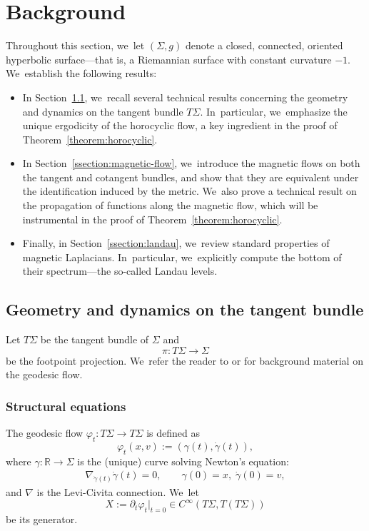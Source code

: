 \documentclass[JEP,XML,SOM,Unicode,published]{cedram}
\theoremstyle{plain}
\theoremstyle{definition}
\newcommand{\R}{\mathbb{R}}
\begin{document}
\section{Background}

\label{section:dynamical-geometric-background}

Throughout this section, we~let $(\Sigma, g)$ denote a closed, connected, oriented hyperbolic surface—that is, a Riemannian surface with constant curvature $-1$. We~establish the following results:

\begin{itemize}
\item In Section~\ref{ssection:geo}, we~recall several technical results concerning the geometry and dynamics on the tangent bundle $T\Sigma$. In~particular, we~emphasize the unique ergodicity of the horocyclic flow, a key ingredient in the proof of Theorem~\ref{theorem:horocyclic}.

\item In Section~\ref{ssection:magnetic-flow}, we~introduce the magnetic flows on both the tangent and cotangent bundles, and show that they are equivalent under the identification induced by the metric. We~also prove a technical result on the propagation of functions along the magnetic flow, which will be instrumental in the proof of Theorem~\ref{theorem:horocyclic}.

\item Finally, in Section~\ref{ssection:landau}, we~review standard properties of magnetic Laplacians. In~particular, we~explicitly compute the bottom of their spectrum—the so-called Landau levels. \end{itemize}

\subsection{Geometry and dynamics on the tangent bundle}

\label{ssection:geo}
Let $T\Sigma$ be the tangent bundle of $\Sigma$ and
\begin{equation}
\label{equation:footpoint}
\pi : T\Sigma \to \Sigma
\end{equation}
be the footpoint projection. We~refer the reader to \cite[Ch.\,1]{Paternain-99} or \cite[Ch.\,13]{Lefeuvre-book} for background material on the geodesic flow.

\subsubsection{Structural equations} The geodesic flow $\varphi_t : T\Sigma \to T\Sigma$ is defined as
\[
\varphi_t(x,v) := (\gamma(t), \dot{\gamma}(t)),
\]
where $\gamma : \R \to \Sigma$ is the (unique) curve solving Newton's equation:
\begin{gather} \label{eq:newton_geodesic}
\nabla_{\dot{\gamma}(t)}\dot{\gamma}(t) = 0, \qquad \gamma(0)=x, \; \dot{\gamma}(0)=v,
\end{gather}
and $\nabla$ is the Levi-Civita connection. We~let
\[
X := \partial_t\varphi_t|_{t=0} \in C^\infty(T\Sigma, T(T\Sigma))
\]
be its generator.
\end{document}
